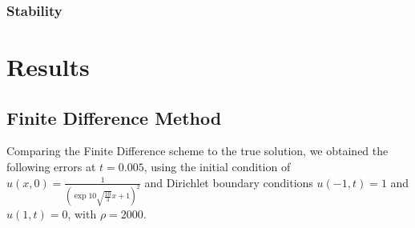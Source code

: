 \documentclass[a4paper]{article}
\begin{document}
		\subsubsection{Stability}
		
\section{Results}\label{sec:results}
	\subsection{Finite Difference Method}
	Comparing the Finite Difference scheme to the true solution, we obtained the following errors at $t=0.005$, using the initial condition of $u(x,0)=\frac{1}{(\exp{10\sqrt{\frac{10}{3}}x}+1)^2}$ and Dirichlet boundary conditions $u(-1, t) = 1$ and $u(1, t) = 0$, with $\rho =2000$. 
    	
\end{document}
